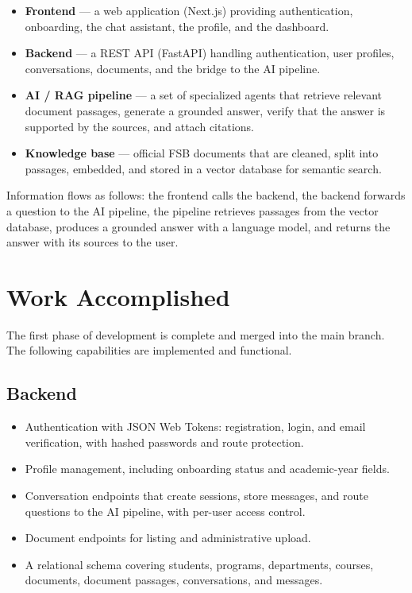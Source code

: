 \documentclass[11pt,a4paper]{article}
\begin{document}
\begin{itemize}
  \item \textbf{Frontend} --- a web application (Next.js) providing authentication,
        onboarding, the chat assistant, the profile, and the dashboard.
  \item \textbf{Backend} --- a REST API (FastAPI) handling authentication, user
        profiles, conversations, documents, and the bridge to the AI pipeline.
  \item \textbf{AI / RAG pipeline} --- a set of specialized agents that retrieve
        relevant document passages, generate a grounded answer, verify that the
        answer is supported by the sources, and attach citations.
  \item \textbf{Knowledge base} --- official FSB documents that are cleaned, split
        into passages, embedded, and stored in a vector database for semantic search.
\end{itemize}

Information flows as follows: the frontend calls the backend, the backend forwards a
question to the AI pipeline, the pipeline retrieves passages from the vector database,
produces a grounded answer with a language model, and returns the answer with its
sources to the user.

\section{Work Accomplished}

The first phase of development is complete and merged into the main branch. The
following capabilities are implemented and functional.

\subsection{Backend}
\begin{itemize}
  \item Authentication with JSON Web Tokens: registration, login, and email
        verification, with hashed passwords and route protection.
  \item Profile management, including onboarding status and academic-year fields.
  \item Conversation endpoints that create sessions, store messages, and route
        questions to the AI pipeline, with per-user access control.
  \item Document endpoints for listing and administrative upload.
  \item A relational schema covering students, programs, departments, courses,
        documents, document passages, conversations, and messages.
\end{itemize}
\end{document}
